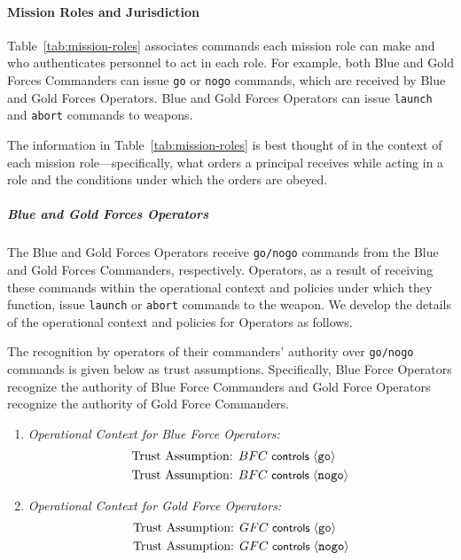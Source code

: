 \paragraph*{Mission Roles and Jurisdiction}

Table~\ref{tab:mission-roles} associates commands each mission role
can make and who authenticates personnel to act in each role. For
example, both Blue and Gold Forces Commanders can issue \texttt{go} or
\texttt{nogo} commands, which are received by Blue and Gold Forces
Operators.  Blue and Gold Forces Operators can issue \texttt{launch}
and \texttt{abort} commands to weapons.

The information in Table~\ref{tab:mission-roles} is best thought of in
the context of each mission role---specifically, what orders a
principal receives while acting in a role and the conditions under
which the orders are obeyed.

\subparagraph*{Blue and Gold Forces Operators}

The Blue and Gold Forces Operators receive \texttt{go/nogo} commands
from the Blue and Gold Forces Commanders, respectively. Operators, as
a result of receiving these commands within the operational context
and policies under which they function, issue \texttt{launch} or
\texttt{abort} commands to the weapon.  We develop the details of the
operational context and policies for Operators as follows.

The recognition by operators of their commanders' authority over
\texttt{go/nogo} commands is given below as trust
assumptions. Specifically, Blue Force Operators recognize the
authority of Blue Force Commanders and Gold Force Operators recognize
the authority of Gold Force Commanders.
\begin{enumerate}[{}]
\item \emph{Operational Context for Blue Force Operators:}
\begin{align*}
  \text{Trust Assumption: } & BFC \text{\small\textsf{ controls }} \langle \mathtt{go} \rangle\\
  \text{Trust Assumption: } & BFC \text{\small\textsf{ controls }} \langle \mathtt{nogo} \rangle
\end{align*}
\item \emph{Operational Context for Gold Force Operators:}
\begin{align*}
  \text{Trust Assumption: } & GFC \text{\small\textsf{ controls }} \langle \mathtt{go} \rangle\\
  \text{Trust Assumption: } & GFC \text{\small\textsf{ controls }} \langle \mathtt{nogo} \rangle
\end{align*}

\end{enumerate}

